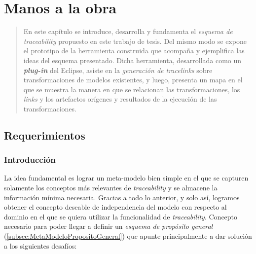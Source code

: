 \documentclass[a4paper,12pt,oneside,spanish]{book}
\begin{document}
\chapter{Manos a la obra}
\label{cap:Propuesta}

\begin{quotation}
En este capítulo se introduce, desarrolla y fundamenta el \textit{esquema de
traceability} propuesto en este trabajo de tesis. Del mismo modo se expone el prototipo de la herramienta construida que acompaña y ejemplifica las ideas del esquema presentado. Dicha herramienta, desarrollada como un \textit{\textbf{plug-in}} del  \textsf{Eclipse}, asiste en la \textit{generación de tracelinks} sobre transformaciones de modelos existentes, y luego, presenta un mapa en el que se muestra la manera en que se relacionan las transformaciones, los \textit{links} y los artefactos orígenes y resultados de la ejecución de las transformaciones.
\end{quotation}


\bigskip


\minitoc 


\pagebreak


\section{Requerimientos}


\subsection{Introducción}
\label{sec:EsquemaPropIntro}

La idea fundamental es lograr un meta-modelo bien simple en el que se capturen solamente los conceptos más relevantes de \textit{traceability} y se almacene la información mínima necesaria. Gracias a todo lo anterior, y solo así, logramos obtener el concepto deseable de independencia del modelo con respecto al dominio en el que se quiera utilizar la funcionalidad de \textit{traceability}. Concepto necesario para poder llegar a definir un \textit{esquema de propósito general} (\ref{subsec:MetaModeloPropositoGeneral}) que apunte principalmente a dar solución a los siguientes desafíos:
\end{document}
